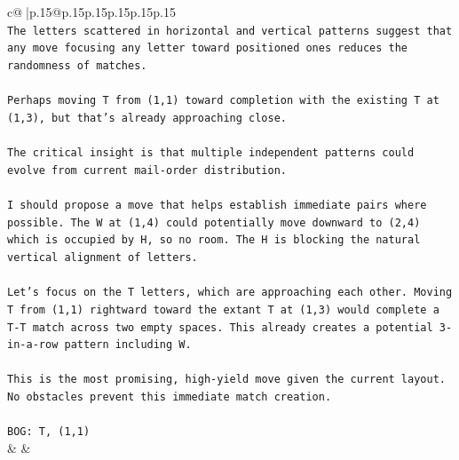 \documentclass{article}
\begin{document}
{\begin{supertabular}{c@{$\;$}|p{.15\linewidth}@{}p{.15\linewidth}p{.15\linewidth}p{.15\linewidth}p{.15\linewidth}p{.15\linewidth}}
{{{\\ 
\texttt{The letters scattered in horizontal and vertical patterns suggest that any move focusing any letter toward positioned ones reduces the randomness of matches.} \\
\\ 
\texttt{Perhaps moving T from (1,1) toward completion with the existing T at (1,3), but that's already approaching close.} \\
\\ 
\texttt{The critical insight is that multiple independent patterns could evolve from current mail{-}order distribution.} \\
\\ 
\texttt{I should propose a move that helps establish immediate pairs where possible. The W at (1,4) could potentially move downward to (2,4) which is occupied by H, so no room. The H is blocking the natural vertical alignment of letters.} \\
\\ 
\texttt{Let's focus on the T letters, which are approaching each other. Moving T from (1,1) rightward toward the extant T at (1,3) would complete a T{-}T match across two empty spaces. This already creates a potential 3{-}in{-}a{-}row pattern including W.} \\
\\ 
\texttt{This is the most promising, high{-}yield move given the current layout. No obstacles prevent this immediate match creation.} \\
\\ 
\texttt{BOG: T, (1,1)} \\
            }
        }
    }
    & & \\ \\


\end{supertabular}}
\end{document}
